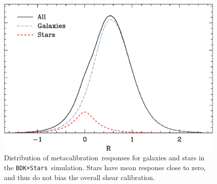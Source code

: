 \documentclass[iop]{emulateapj}
\newcommand{\snr}{$S/N$}
\newcommand{\mcal}{metacalibration}
\newcommand{\bdsim}{\texttt{BDK}}
\newcommand{\bdstar}{\texttt{BDK+Stars}}
\begin{document}

\begin{figure}
    \centering
    \includegraphics[width=\columnwidth]{R-bdj03-bdj03stars.eps}

    \caption{Distribution of \mcal\ responses for galaxies and stars in
    the \bdstar\ simulation.  Stars have mean response close to zero,
    and thus do not bias the overall shear calibration.}

\label{fig:Rstars}
\end{figure}





\end{document}
